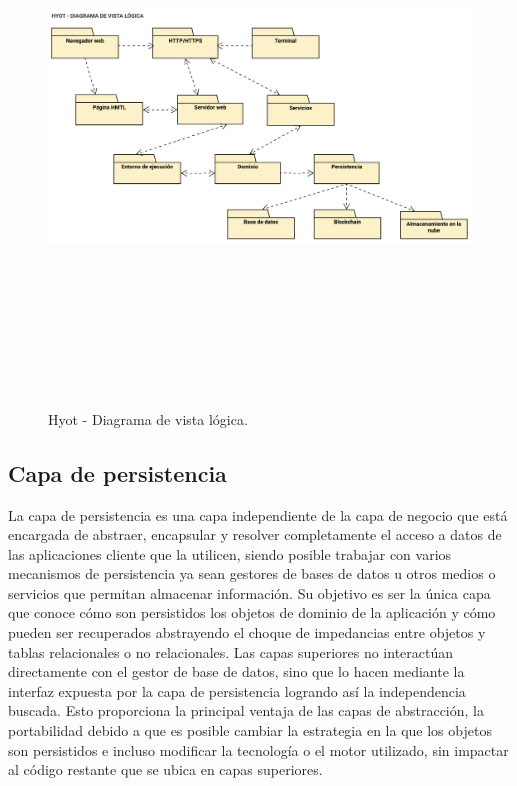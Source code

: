 \documentclass[12pt,a4paper, twoside]{report}
\begin{document}
	\begin{figure}[!ht]   
		\caption{Hyot - Diagrama de vista lógica.} 
		\begin{center} 
			\includegraphics[width=18cm,height=14cm]{Images/design/d_logicview} \\
			\label{fig:design_logicview} 
		\end{center}  
	\end{figure}	
	
	\subsection{Capa de persistencia} \label{persistencia} %
	
	La capa de persistencia es una capa independiente de la capa de negocio que está encargada de abstraer, encapsular y resolver completamente el acceso a datos de las aplicaciones cliente que la utilicen, siendo posible trabajar con varios mecanismos de persistencia ya sean gestores de bases de datos u otros medios o servicios que permitan almacenar información. Su objetivo es ser la única capa que conoce cómo son persistidos los objetos de dominio de la aplicación y cómo pueden ser recuperados abstrayendo el choque de impedancias entre objetos y tablas relacionales o no relacionales. Las capas superiores no interactúan directamente con el gestor de base de datos, sino que lo hacen mediante la interfaz expuesta por la capa de persistencia logrando así la independencia buscada. Esto proporciona la principal ventaja de las capas de abstracción, la portabilidad debido a que es posible cambiar la estrategia en la que los objetos son persistidos e incluso modificar la tecnología o el motor utilizado, sin impactar al código restante que se ubica en capas superiores. \\
	
\end{document}
